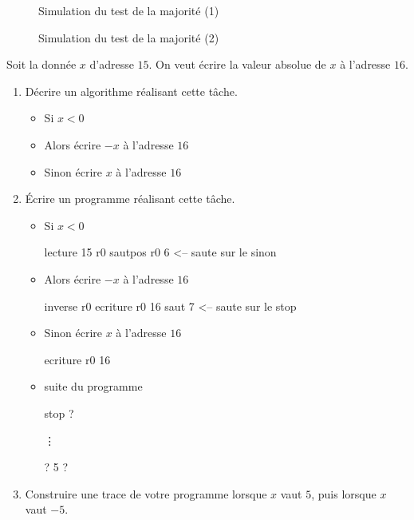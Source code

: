   \begin{correction}
\begin{figure}
  \centering
  
  \caption{Simulation du test de la majorité (1)}
  \label{simmax1}
\end{figure}
\begin{figure}
  \centering
  
  \caption{Simulation du test de la majorité (2)}
  \label{simmax1}
\end{figure}
  \end{correction}

Soit la donnée $x$ d'adresse $15$. On veut écrire la valeur absolue de $x$ à
  l'adresse $16$.
\begin{enumerate}
\item Décrire un algorithme réalisant cette tâche.
  \begin{correction}
    \begin{itemize}
    \item Si $x < 0$
    \item Alors écrire $-x$ à l'adresse $16$
     \item Sinon écrire $x$ à l'adresse $16$
    \end{itemize}
\end{correction}
\item Écrire un programme réalisant cette tâche.
\begin{correction}
\begin{itemize}
\item Si $x < 0$
\begin{listing}{1}
lecture 15 r0    
sautpos r0 6    <-- saute sur le sinon
\end{listing}
\item Alors écrire $-x$ à l'adresse $16$
\begin{listing}{3}
inverse r0
ecriture r0 16
saut 7         <-- saute sur le stop
\end{listing}
\item Sinon écrire $x$ à l'adresse $16$
\begin{listing}{6}
ecriture r0 16
\end{listing}
\item suite du programme
\begin{listing}{7}
stop
?
\end{listing}
\vdots
\begin{listing}{14}
?
5
?
\end{listing}
\end{itemize}
\end{correction}

\item Construire une trace de votre programme lorsque $x$ vaut $5$,
  puis lorsque $x$ vaut $-5$.
\end{enumerate}

